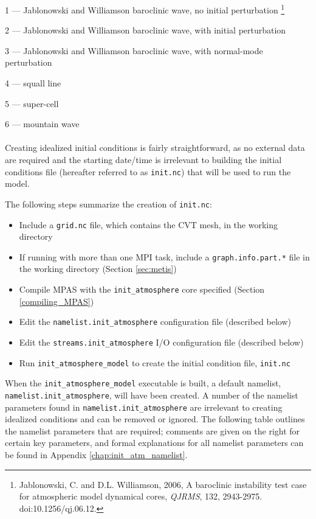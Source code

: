 1 --- Jablonowski and Williamson baroclinic wave, no initial perturbation
\footnote{Jablonowski, C. and D.L. Williamson, 2006, A baroclinic instability test case for atmospheric model dynamical cores, {\em QJRMS}, 132, 2943-2975. doi:10.1256/qj.06.12.}

2 --- Jablonowski and Williamson baroclinic wave, with initial perturbation

3 --- Jablonowski and Williamson baroclinic wave, with normal-mode perturbation

4 --- squall line

5 --- super-cell

6 --- mountain wave\\
\\
Creating idealized initial conditions is fairly straightforward, as no external data are required and the starting date/time is irrelevant to building the initial conditions file (hereafter referred to as {\tt init.nc}) that will be used to run the model.

The following steps summarize the creation of {\tt init.nc}:

\begin{itemize}
\item Include a {\tt grid.nc} file, which contains the CVT mesh, in the working directory
\item If running with more than one MPI task, include a {\tt graph.info.part.*} file in the working directory (Section \ref{sec:metis})
\item Compile MPAS with the {\tt init\_atmosphere} core specified (Section \ref{compiling_MPAS})
\item Edit the {\tt namelist.init\_atmosphere} configuration file (described below)
\item Edit the {\tt streams.init\_atmosphere} I/O configuration file (described below)
\item Run {\tt init\_atmosphere\_model} to create the initial condition file, {\tt init.nc}
\end{itemize}

When the {\tt init\_atmosphere\_model} executable is built, a default namelist, {\tt namelist.init\_atmosphere}, will have been created. A number of the namelist parameters found in {\tt namelist.init\_atmosphere} are irrelevant to creating idealized conditions and can be removed or ignored.  The following table outlines the namelist parameters that are required; comments are given on the right for certain key parameters, and formal explanations for all namelist parameters can be found in Appendix \ref{chap:init_atm_namelist}.


